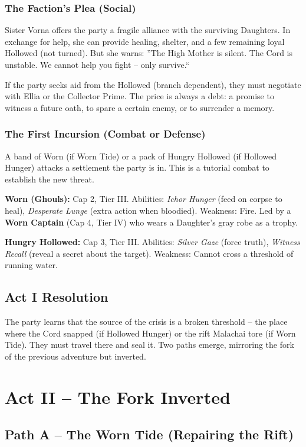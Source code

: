 \documentclass[10pt,twoside]{book}
\begin{document}
\subsection{The Faction's Plea (Social)}
Sister Vorna offers the party a fragile alliance with the surviving Daughters. In exchange for help, she can provide healing, shelter, and a few remaining loyal Hollowed (not turned). But she warns: ''The High Mother is silent. The Cord is unstable. We cannot help you fight -- only survive.``

If the party seeks aid from the Hollowed (branch dependent), they must negotiate with Ellia or the Collector Prime. The price is always a debt: a promise to witness a future oath, to spare a certain enemy, or to surrender a memory.

\subsection{The First Incursion (Combat or Defense)}
A band of Worn (if Worn Tide) or a pack of Hungry Hollowed (if Hollowed Hunger) attacks a settlement the party is in. This is a tutorial combat to establish the new threat.

\textbf{Worn (Ghouls):} Cap 2, Tier III. Abilities: \textit{Ichor Hunger} (feed on corpse to heal), \textit{Desperate Lunge} (extra action when bloodied). Weakness: Fire. Led by a \textbf{Worn Captain} (Cap 4, Tier IV) who wears a Daughter's gray robe as a trophy.

\textbf{Hungry Hollowed:} Cap 3, Tier III. Abilities: \textit{Silver Gaze} (force truth), \textit{Witness Recall} (reveal a secret about the target). Weakness: Cannot cross a threshold of running water.

\section{Act I Resolution}
The party learns that the source of the crisis is a broken threshold -- the place where the Cord snapped (if Hollowed Hunger) or the rift Malachai tore (if Worn Tide). They must travel there and seal it. Two paths emerge, mirroring the fork of the previous adventure but inverted.

\chapter{Act II -- The Fork Inverted}

\section{Path A -- The Worn Tide (Repairing the Rift)}
\end{document}
